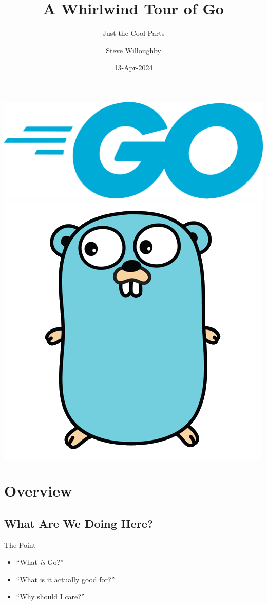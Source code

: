 \documentclass[pdf,t]{beamer}
\title{A Whirlwind Tour of Go}
\subtitle{Just the Cool Parts}
\author{Steve Willoughby}
\date{13-Apr-2024\\{\tiny\REV}}
\begin{document}
\begin{frame}
    \titlepage
    \begin{center}
    \includegraphics[height=.25\textheight]{go-logo}
    \includegraphics[height=.25\textheight]{gopher}
    \end{center}
\end{frame}
\section[Overview]{Overview}
\subsection{What Are We Doing Here?}
\begin{frame}{The Point}
    \begin{itemize}
        \item ``What \emph{is} Go?''
        \item ``What is it actually good for?''
        \item ``Why should I care?''
    \end{itemize}
\end{frame}
\end{document}

